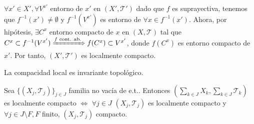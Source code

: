 \begin{dem}
  $\forall x' \in X', \forall V^{x'}$ entorno de $x'$ en $( X', \mathcal{T}' )$ dado que $f$ es suprayectiva, tenemos que $f^{-1}(x') \neq \emptyset$ y $f^{-1}(V^{x'})$ es entorno de $\forall x \in f^{-1}(x')$. Ahora, por hipótesis, $\exists C^{x}$ entorno compacto de $x$ en $( X, \mathcal{T} )$ tal que $C^{x} \subset f^{-1}(V^{x'}) \xRightarrow[]{ f \text{ cont. ab.} } f(C^{x}) \subset V^{x'}$, donde $f(C^{x})$ es entorno compacto de $x'$. Por tanto, $( X', \mathcal{T}' )$ es localmente compacto.
\end{dem}

\begin{cor}
  La compacidad local es invariante topológico.
\end{cor}

\begin{prop}
  Sea $\{ ( X_{j}, \mathcal{T}_{j} ) \}_{j \in J}$ familia no vacía de e.t.. Entonces $( \sum_{k \in J} X_{k}, \sum_{k \in J} \mathcal{T}_{k})$ es localmente compacto $\Leftrightarrow$ $\forall j \in J$ $( X_{j}, \mathcal{T}_{j} )$ es localmente compacto  y $\forall j \in J \setminus F, F$ finito, $( X_{j}, \mathcal{T}_{j} )$ compacto.
\end{prop}

